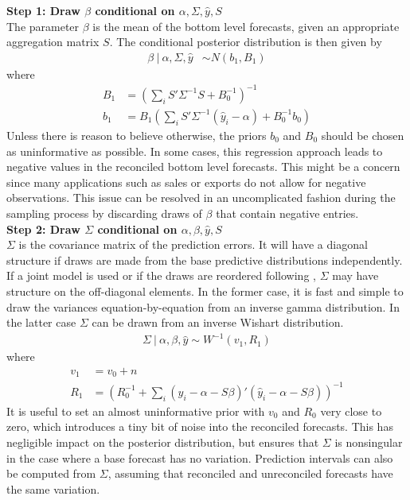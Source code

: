 \documentclass[a4paper,fleqn,11pt]{article}
\begin{document}
\noindent\textbf{Step 1: Draw $\beta$ conditional on $\alpha,\Sigma,\hat{y},S$}\\
The parameter $\beta$ is the mean of the bottom level forecasts, given an appropriate aggregation matrix $S$. The conditional posterior distribution is then given by
\begin{align}
\beta\ |\ \alpha,\Sigma,\hat{y} &\sim N(b_1,B_1)
\end{align}
where
\begin{align*}
B_1 &= \left(\sum_i S'\Sigma^{-1}S + B_0^{-1}\right)^{-1} \\
b_1 &= B_1 \left(\sum_i S'\Sigma^{-1} (\hat{y}_i - \alpha) + B_0^{-1}b_0\right)
\end{align*}
Unless there is reason to believe otherwise, the priors $b_0$ and $B_0$ should be chosen as uninformative as possible. In some cases, this regression approach leads to negative values in the reconciled bottom level forecasts. This might be a concern since many applications such as sales or exports do not allow for negative observations. This issue can be resolved in an uncomplicated fashion during the sampling process by discarding draws of $\beta$ that contain negative entries.\\

\noindent\textbf{Step 2: Draw $\Sigma$ conditional on $\alpha,\beta,\hat{y},S$}\\
$\Sigma$ is the covariance matrix of the prediction errors. It will have a diagonal structure if draws are made from the base predictive distributions independently.  If a joint model is used or if the draws are reordered following \cite{Jeon2018}, $\Sigma$ may have structure on the off-diagonal elements. In the former case, it is fast and simple to draw the variances equation-by-equation from an inverse gamma distribution.  In the latter case $\Sigma$ can be drawn from an inverse Wishart distribution.
\begin{align}
\Sigma\ |\ \alpha,\beta,\hat{y} \sim W^{-1}(v_1,R_1)
\end{align}
where
\begin{align*}
v_1 &= v_0 + n\\
R_1 &=  \left( R_0^{-1} + \sum_i (\hat{y}_i - \alpha - S \beta)'(\hat{y}_i - \alpha - S \beta) \right)^{-1}
\end{align*}
It is useful to set an almost uninformative prior with $v_0$ and $R_0$ very close to zero, which introduces a tiny bit of noise into the reconciled forecasts. This has negligible impact on the posterior distribution, but ensures that $\Sigma$ is nonsingular in the case where a base forecast has no variation. Prediction intervals can also be computed from $\Sigma$, assuming that reconciled and unreconciled forecasts have the same variation.
\end{document}
